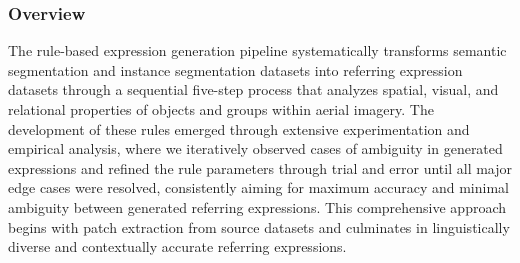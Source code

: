 \subsubsection{Overview}
The rule-based expression generation pipeline systematically transforms semantic segmentation and instance segmentation datasets into referring expression datasets through a sequential five-step process that analyzes spatial, visual, and relational properties of objects and groups within aerial imagery. The development of these rules emerged through extensive experimentation and empirical analysis, where we iteratively observed cases of ambiguity in generated expressions and refined the rule parameters through trial and error until all major edge cases were resolved, consistently aiming for maximum accuracy and minimal ambiguity between generated referring expressions. This comprehensive approach begins with patch extraction from source datasets and culminates in linguistically diverse and contextually accurate referring expressions.

